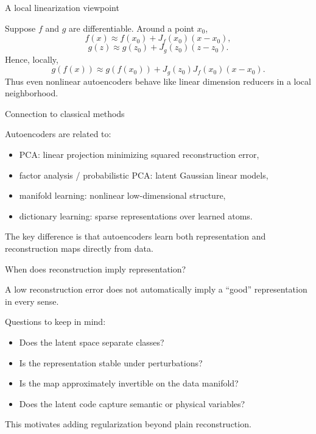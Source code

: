 \documentclass[aspectratio=169]{beamer}
\begin{document}
\begin{frame}{A local linearization viewpoint}

Suppose \(f\) and \(g\) are differentiable. Around a point \(x_0\),
\[
f(x) \approx f(x_0) + J_f(x_0)(x-x_0),
\]
\[
g(z) \approx g(z_0) + J_g(z_0)(z-z_0).
\]
Hence, locally,
\[
g(f(x)) \approx g(f(x_0)) + J_g(z_0)J_f(x_0)(x-x_0).
\]
Thus even nonlinear autoencoders behave like linear dimension reducers in a local neighborhood.

\end{frame}

\begin{frame}{Connection to classical methods}

Autoencoders are related to:
\begin{itemize}
\item PCA: linear projection minimizing squared reconstruction error,
\item factor analysis / probabilistic PCA: latent Gaussian linear models,
\item manifold learning: nonlinear low-dimensional structure,
\item dictionary learning: sparse representations over learned atoms.
\end{itemize}
The key difference is that autoencoders learn both representation and reconstruction maps directly from data.

\end{frame}

\begin{frame}{When does reconstruction imply representation?}

A low reconstruction error does not automatically imply a ``good'' representation in every sense.

Questions to keep in mind:
\begin{itemize}
\item Does the latent space separate classes?
\item Is the representation stable under perturbations?
\item Is the map approximately invertible on the data manifold?
\item Does the latent code capture semantic or physical variables?
\end{itemize}
This motivates adding regularization beyond plain reconstruction.

\end{frame}
\end{document}
